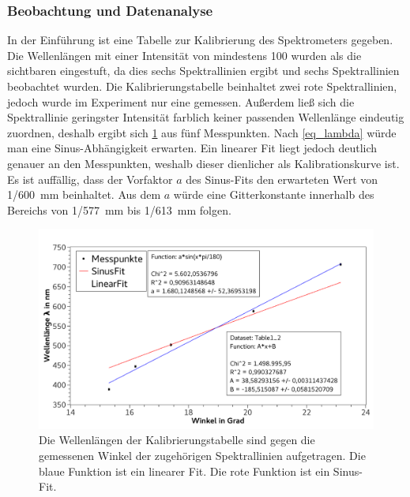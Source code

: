 \documentclass[
	a4paper,
	12pt,
	pagesize,
	ngerman
]{scrartcl}
\begin{document}
	\subsubsection{Beobachtung und Datenanalyse}
	In der Einführung ist eine Tabelle zur Kalibrierung des Spektrometers gegeben. %
	Die Wellenlängen mit einer Intensität von mindestens 100 wurden als die sichtbaren eingestuft, da dies sechs Spektrallinien ergibt und sechs Spektrallinien beobachtet wurden. %
	Die Kalibrierungstabelle beinhaltet zwei rote Spektrallinien, jedoch wurde im Experiment nur eine gemessen.
	Außerdem ließ sich die Spektrallinie geringster Intensität farblich keiner passenden Wellenlänge eindeutig zuordnen, deshalb ergibt sich \cref{fig_helium} aus fünf Messpunkten. %
	Nach \cref{eq_lambda} würde man eine Sinus-Abhängigkeit erwarten. 
	Ein linearer Fit liegt jedoch deutlich genauer an den Messpunkten, weshalb dieser dienlicher als Kalibrationskurve ist.%
	Es ist auffällig, dass der Vorfaktor $a$ des Sinus-Fits den erwarteten Wert von 1/\SI{600}{mm} beinhaltet. 
	Aus dem $a$ würde eine Gitterkonstante innerhalb des Bereichs von 1/\SI{577}{mm} bis 1/\SI{613}{mm} folgen. %
	

	\begin{figure}[H] 
		\includegraphics[width=1\textwidth]{fig_helium} 
		\centering
		\caption{Die Wellenlängen der Kalibrierungstabelle sind gegen die gemessenen Winkel der zugehörigen Spektrallinien aufgetragen.
		Die blaue Funktion ist ein linearer Fit.
		Die rote Funktion ist ein Sinus-Fit.}
		\label{fig_helium}
		\centering
	\end{figure}
\end{document}
